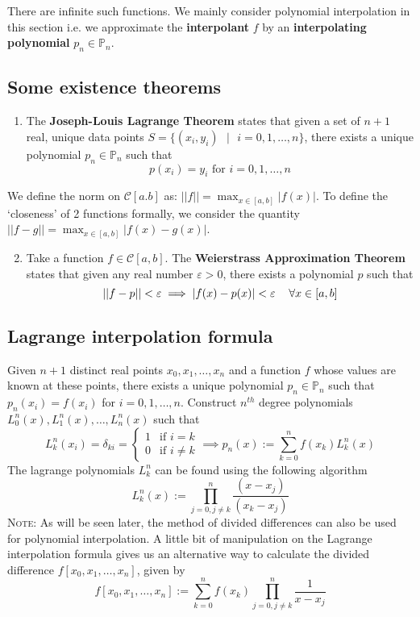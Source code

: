 \documentclass[11pt]{article}
\theoremstyle{definition}
\let\e\varepsilon
\newcommand{\C}{\mathcal{C}}
\begin{document}
There are infinite such functions. We mainly consider polynomial interpolation in this section i.e. we approximate the \textbf{interpolant} $f$ by an \textbf{interpolating polynomial} $p_n\in\mathbb{P}_n$.

\subsection{Some existence theorems}

\begin{enumerate}
	\item The \textbf{Joseph-Louis Lagrange Theorem} states that given a set of $n+1$ real, unique data points $S=\{(x_i,y_i)\text{ }|\text{ }i=0,1,\dots,n\}$, there exists a unique polynomial $p_n\in\mathbb{P}_n$ such that $$p(x_i)=y_i\text{ for }i=0,1,\dots,n$$
\end{enumerate}
We define the norm on $\mathcal{C}[a.b]$ as:
$\displaystyle||f||=\max_{x\in[a,b]}|f(x)|$. To define the `closeness' of 2 functions formally, we consider the quantity
$\displaystyle||f-g||=\max_{x\in [a,b]}\left|f(x)-g(x)\right|$. 
\begin{enumerate}
	\setcounter{enumi}{1}
	\item  Take a function $f\in\C[a,b]$. The \textbf{Weierstrass Approximation Theorem} states that given any real number $\e>0$, there exists a polynomial $p$ such that 
$$||f-p||<\e\implies |f(x)-p(x)|<\e\text{\hspace{12pt}}\forall x\in[a,b]$$
\end{enumerate}

\subsection{Lagrange interpolation formula} 
Given $n+1$ distinct real points $x_0,x_1,\dots,x_n$ and a function $f$ whose values are known at these points, there exists a unique polynomial $p_n\in\mathbb{P}_n$ such that $p_n(x_i)=f(x_i)$ for $ i=0,1,\dots,n$. Construct $n^{th}$ degree polynomials $L_0^n(x),L_1^n(x),\dots,L_n^n(x)$ such that
$$L_k^n(x_i)=\delta_{ki}=\left\lbrace\begin{array}{lr}
1 & \text{if } i=k\\
0 & \text{if } i\neq k
\end{array}\right.\implies \boxed{p_n(x):=\sum_{k=0}^nf(x_k)L_k^n(x)}$$
The lagrange polynomials $L_k^n$ can be found using the following algorithm
$$\boxed{L_k^n(x):=\prod_{j=0,j\neq k}^n\frac{(x-x_j)}{(x_k-x_j)}}$$
\textsc{Note:} As will be seen later, the method of divided differences can also be used for polynomial interpolation. A little bit of manipulation on the Lagrange interpolation formula gives us an alternative way to calculate the divided difference $f[x_0,x_1,\dots,x_n]$, given by $$f[x_0,x_1,\dots,x_n]:=\sum_{k=0}^nf(x_k)\prod_{j=0,j\neq k}^{n}\frac{1}{x-x_j}$$
\newpage
\end{document}
